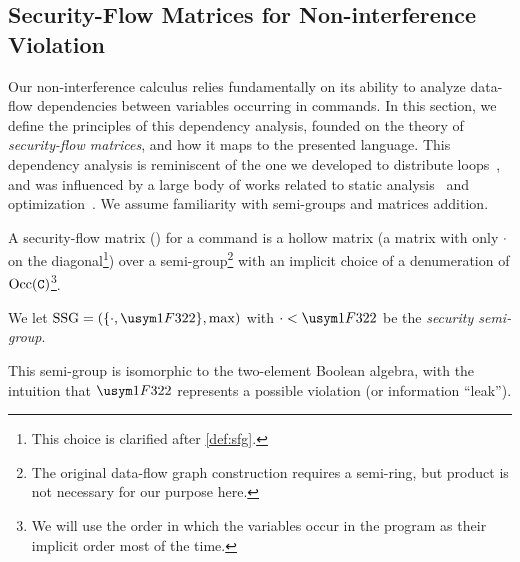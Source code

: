 \tocless\subsection{Security-Flow Matrices for Non-interference Violation}
\label{subsec:sfg}

Our non-interference calculus relies fundamentally on its ability to analyze data-flow dependencies between variables occurring in commands.
In this section, we define the principles of this dependency analysis, founded on the theory of \emph{security-flow matrices}, and how it maps to the presented language.
This dependency analysis is reminiscent of the one we developed to distribute loops~\cite{Aubert2023a}, and was influenced by a large body of works related to static analysis~\cite{Abel20002,Kristiansen2005b,Lee2001,Aubert2022b,Jones2009} and optimization~\cite{Moyen2017}.
We assume %
familiarity with semi-groups and matrices addition. %

A security-flow matrix (\SFM) for a %
command %
is a hollow matrix (\ie a matrix with only $\cdot$ on the diagonal\footnote{This choice is clarified after \autoref{def:sfg}.}) over a semi-group\footnote{The original data-flow graph construction requires a semi-ring, but product is not necessary for our purpose here.} with an implicit choice of a denumeration of \(\operatorname{Occ}(\mathtt{C})\)\footnote{We will use the order in which the variables occur in the program as their implicit order most of the time.\label{footnote:order-variables}}.

\begin{definition}
    We let \(\SSG=(\{\nv, \vi\}, \max)\) with \(\nv < \vi\) be the \emph{security semi-group}.
\end{definition}

This semi-group is isomorphic to the two-element Boolean algebra, with the intuition that \(\vi\) represents a possible violation (or information \enquote{leak}).

